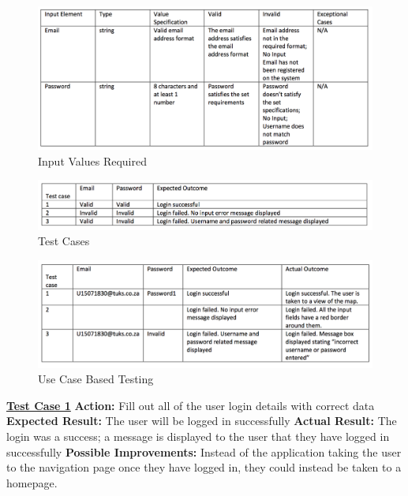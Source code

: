 \documentclass[english]{article}
\begin{document}
\begin{figure}[H]
\centering
\includegraphics[width=1.0\textwidth]{userlogin_input_values_required}
\caption{Input Values Required}
\end{figure}

\begin{figure}[H]
\centering
\includegraphics[width=1.0\textwidth]{userlogin_test_cases}
\caption{Test Cases}
\end{figure}

\begin{figure}[H]
\centering
\includegraphics[width=1.0\textwidth]{userlogin_use_case_based_testing}
\caption{Use Case Based Testing}
\end{figure}

\textbf{\underline{Test Case 1}}\newline
\textbf{Action:} Fill out all of the user login details with correct data\newline
\textbf{Expected Result:} The user will be logged in successfully\newline
\textbf{Actual Result:} The login was a success; a message is displayed to the user that they have logged in successfully\newline
\textbf{Possible Improvements:} Instead of the application taking the user to the navigation page once they have logged in, they could instead be taken to a homepage. \newline
\end{document}
